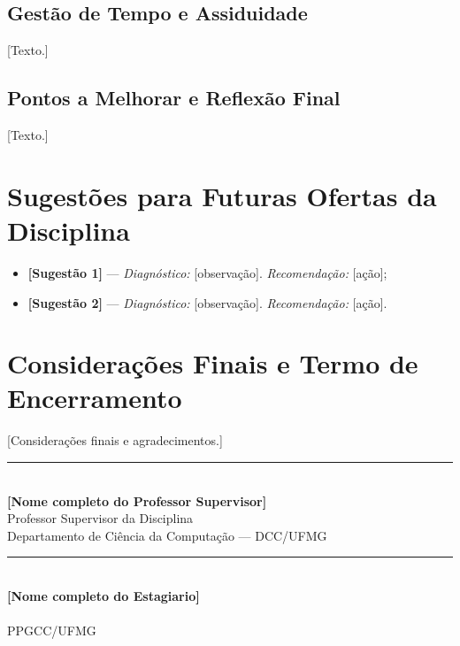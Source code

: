 \documentclass[12pt]{article}
\newcommand{\NomeProfessor}{[Nome completo do Professor Supervisor]}
\newcommand{\NomeEstagiario}{[Nome completo do Estagiario]}
\newcommand{\EstagioNivel}{[Estágio em Docência I ou II]}
\newif\ifmostrarinstrucoes
\newcommand{\instrucao}[1]{%
  \ifmostrarinstrucoes
  \begin{tcolorbox}[colback=instrbg, colframe=dccblue, arc=2mm, boxrule=0.6pt,
    title=\textbf{INSTRUÇÃO (apagar na versão final)}, fonttitle=\small]
  \small #1
  \end{tcolorbox}
  \fi}
\begin{document}
\subsection{Gestão de Tempo e Assiduidade}
[Texto.]
\subsection{Pontos a Melhorar e Reflexão Final}
[Texto.]

\newpage
\section{Sugestões para Futuras Ofertas da Disciplina}\label{sec:sugestoes}
\instrucao{Item 5 das Diretrizes: proponha melhorias concretas e justificadas. Para cada sugestão, indique o diagnóstico (o que foi observado) e a recomendação (o que fazer).}
\begin{itemize}[leftmargin=*]
    \item \textbf{[Sugestão 1]} --- \emph{Diagnóstico:} [observação]. \emph{Recomendação:} [ação];
    \item \textbf{[Sugestão 2]} --- \emph{Diagnóstico:} [observação]. \emph{Recomendação:} [ação].
\end{itemize}

\newpage
\section{Considerações Finais e Termo de Encerramento}\label{sec:conclusao}
\instrucao{Declare que as atividades da Proposta de Trabalho foram cumpridas (ou justifique desvios), faça os agradecimentos e colete as assinaturas.}
[Considerações finais e agradecimentos.]

\vspace{2.5cm}
\noindent
\begin{minipage}[t]{0.48\textwidth}
    \centering
    \rule{\linewidth}{0.5pt}\\
    \textbf{\NomeProfessor}\\
    Professor Supervisor da Disciplina\\
    Departamento de Ciência da Computação --- DCC/UFMG
\end{minipage}
\hfill
\begin{minipage}[t]{0.48\textwidth}
    \centering
    \rule{\linewidth}{0.5pt}\\
    \textbf{\NomeEstagiario}\\
    \EstagioNivel\\
    PPGCC/UFMG
\end{minipage}

\newpage


\end{document}
